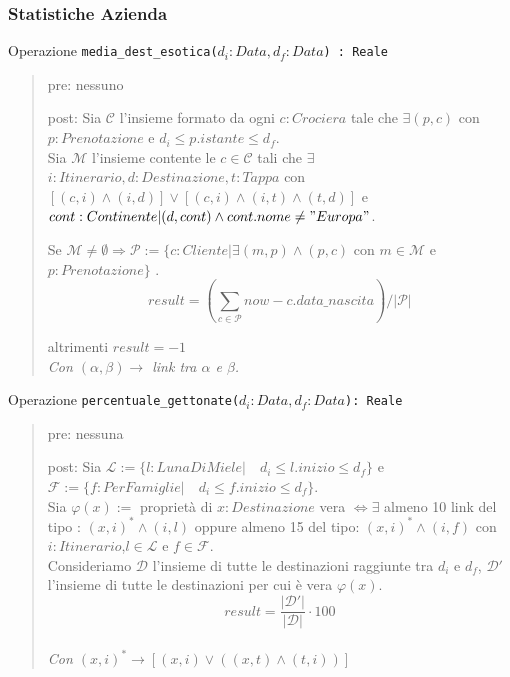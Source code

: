 \documentclass[12pt, letterpaper]{article}
\newcommand{\code}[1]{\colorbox{light-gray}{\texttt{#1}}}
\begin{document}
\subsubsection{Statistiche Azienda}
Operazione
\code{media\_dest\_esotica($d_i:Data, d_f:Data$) : Reale}
\begin{quote}
    pre: nessuno

post: Sia $\mathcal{C}$ l'insieme formato da ogni $c:Crociera$ tale che $\exists (p,c)$ con $p:Prenotazione$ e $d_i \le p.istante\le d_f$.\\
Sia $\mathcal{M}$ l'insieme contente le $ c\in\mathcal{C}$ tali che $\exists$ $i:Itinerario,d:Destinazione,t:Tappa$ con
$[(c,i)\wedge(i,d)]\vee[(c,i)\wedge(i,t)\wedge(t,d)] $  e  $cont:Continente|(d,cont)\wedge cont.nome \neq "Europa"$.

Se $\mathcal{M}\neq\emptyset\Rightarrow\mathcal{P}:=\{ c:Cliente | \exists (m,p)\wedge(p,c)$ con $m\in\mathcal{M}$ e $p:Prenotazione\}$ .\\

$$result = (\sum_{c\in\mathcal{P}}now - c.data\_nascita)/|\mathcal{P}|$$

altrimenti $result = -1$\\

\hfill{}\textit{ Con $(\alpha,\beta)\longrightarrow$ link tra $\alpha$ e $\beta$.}
\end{quote}
Operazione
\code{percentuale\_gettonate($d_i:Data, d_f:Data$): Reale}
\begin{quote}
    pre: nessuna
    
    post: Sia $\mathcal{L}:= \{l:LunaDiMiele | \quad d_i\le l.inizio\le d_f \}$ e\\ $
    \mathcal{F}:= \{f:PerFamiglie | \quad d_i\le f.inizio\le d_f \}$.\\
    Sia $\varphi(x):=$ proprietà di $x:Destinazione$ vera $\Leftrightarrow\exists$ almeno 10 link del tipo 
    : $(x,i)^*\wedge(i,l)$ oppure almeno 15 del tipo: $(x,i)^*\wedge(i,f)$ con $i:Itinerario$,$l\in\mathcal{L}$ e $f\in\mathcal{F}$.\\

    Consideriamo $\mathcal{D}$ l'insieme di tutte le destinazioni raggiunte tra $d_i$ e $d_f$, $\mathcal{D}'$ l'insieme di tutte le destinazioni per cui è vera $\varphi(x)$.\\
    $$result = \frac{|\mathcal{D}'|}{|\mathcal{D}|}\cdot 100$$\\

\hfill{}\textit{Con $(x,i)^*\rightarrow[(x,i)\vee((x,t)\wedge(t,i))]$} 


\end{quote}
\end{document}
